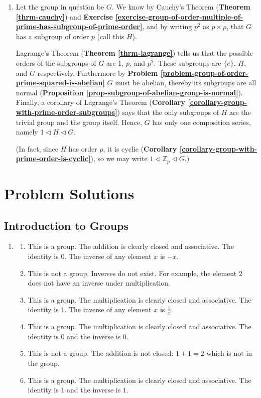 \begin{enumerate}
    \item Let the group in question be $G$. We know by Cauchy's Theorem (\textbf{Theorem \ref{thrm-cauchy}}) and \textbf{Exercise \ref{exercise-group-of-order-multiple-of-prime-has-subgroup-of-prime-order}}, and by writing $p^2$ as $p \times p$, that $G$ has a subgroup of order $p$ (call this $H$).
    
    Lagrange's Theorem (\textbf{Theorem \ref{thrm-lagrange}}) tells us that the possible orders of the subgroups of $G$ are 1, $p$, and $p^2$. These subgroups are $\{e\}$, $H$, and $G$ respectively. Furthermore by \textbf{Problem \ref{problem-group-of-order-prime-squared-is-abelian}} $G$ must be abelian, thereby its subgroups are all normal (\textbf{Proposition \ref{prop-subgroup-of-abelian-group-is-normal}}). Finally, a corollary of Lagrange's Theorem (\textbf{Corollary \ref{corollary-group-with-prime-order-subgroups}}) says that the only subgroups of $H$ are the trivial group and the group itself. Hence, $G$ has only one composition series, namely $1 \lhd H \lhd G$.
    
    (In fact, since $H$ has order $p$, it is cyclic (\textbf{Corollary \ref{corollary-group-with-prime-order-is-cyclic}}), so we may write $1 \lhd \mathbb{Z}_p \lhd G$.)
\end{enumerate}

\chapter{Problem Solutions}

\section{Introduction to Groups}
\begin{enumerate}
    \item \begin{enumerate}[label=(\alph*)]
        \item This is a group. The addition is clearly closed and associative. The identity is 0. The inverse of any element $x$ is $-x$.
        \item This is not a group. Inverses do not exist. For example, the element $2$ does not have an inverse under multiplication.
        \item This is a group. The multiplication is clearly closed and associative. The identity is $1$. The inverse of any element $x$ is $\frac1x$.
        \item This is a group. The multiplication is clearly closed and associative. The identity is $0$ and the inverse is $0$.
        \item This is not a group. The addition is not closed: $1 + 1 = 2$ which is not in the group.
        \item This is a group. The multiplication is clearly closed and associative. The identity is $1$ and the inverse is $1$.
    \end{enumerate}
\end{enumerate}

